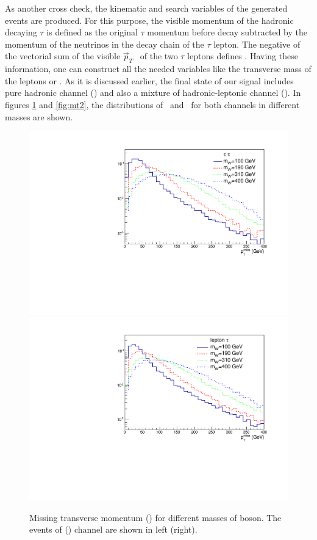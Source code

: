 As another cross check, the kinematic  and search  variables of the generated events are produced. 
For this purpose, the visible momentum of the hadronic decaying $\tau$ is defined as the original $\tau$ momentum before decay subtracted by the momentum of the neutrinos in the decay chain of the $\tau$ lepton. The negative of the vectorial sum of the visible $\vec{p}_T$ ~of the two $\tau$ leptons defines \MET. Having these information, one can construct all the needed variables like the transverse mass of the leptons or \mttwo. 
As it is discussed earlier, the final state of our signal includes pure hadronic channel (\tauTau) and also a mixture of hadronic-leptonic channel (\lepTau ).  In figures \ref{fig:met} and \ref{fig:mt2}, the distributions of \mttwo ~and \MET ~for both channels in different \wprime masses are shown.
\begin{figure}[htb]
	\centering
	\includegraphics*[width=.45\textwidth]{figs/MET_hh.pdf}
	\hspace{3mm}
	\includegraphics*[width=.45\textwidth]{figs/MET_lh.pdf}
	\caption{Missing transverse momentum (\MET) for different masses of \wprime boson. The events of \tauTau(\lepTau) channel are shown in left (right).}
	\label{fig:met}
\end{figure}
